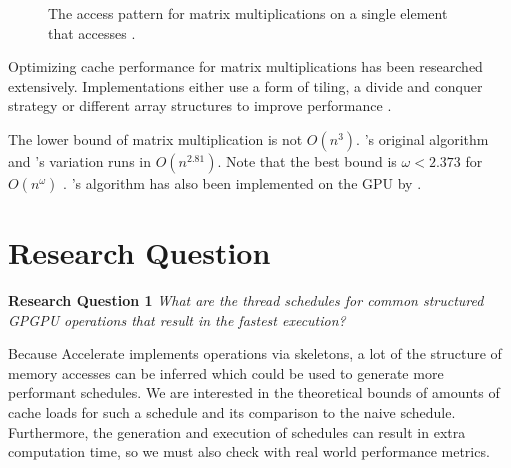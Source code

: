\documentclass{article}
\begin{document}
\begin{figure}[h]
    \centering
    \qquad

    \caption{
        The access pattern for matrix multiplications on a single element  that accesses .
    }
    \label{fig:matmult_access_pattern}
\end{figure}

Optimizing cache performance for matrix multiplications has been researched extensively.
Implementations either use a form of tiling, a divide and conquer strategy or different array structures to improve performance \cite{bader2006cache,frigo1999cache}.

The lower bound of matrix multiplication is not $O(n^3)$.
\citet{strassen1969gaussian}'s original algorithm and \citet{winograd1971multiplication}'s variation runs in $O(n^{2.81})$.
Note that the best bound is $\omega < 2.373$ for $O(n^\omega)$ \cite{alman2018limits}.
\citeauthor{strassen1969gaussian}'s algorithm has also been implemented on the GPU by \citet{li2011strassen}.

\section{Research Question}

\begin{mdframed}
    \textbf{Research Question 1}
    \emph{What are the thread schedules for common structured GPGPU operations that result in the fastest execution?}
\end{mdframed}
Because Accelerate implements operations via skeletons, a lot of the structure of memory accesses can be inferred which could be used to generate more performant schedules.
We are interested in the theoretical bounds of amounts of cache loads for such a schedule and its comparison to the naive schedule.
Furthermore, the generation and execution of schedules can result in extra computation time, so we must also check with real world performance metrics.
\end{document}
